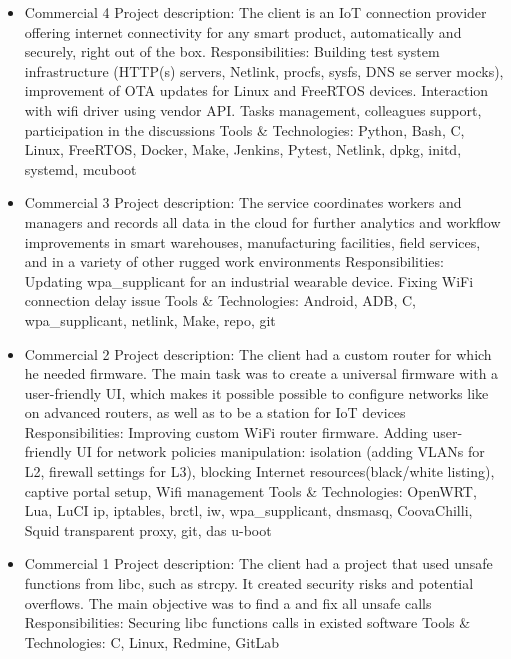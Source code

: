 \begin{itemize}
    \item Commercial 4\break
    Project description:\break
    The client is an IoT connection provider offering internet connectivity for any
    smart product, automatically and securely, right out of the box.\break
    Responsibilities:\break
    Building test system infrastructure (HTTP(s) servers, Netlink, procfs, sysfs, DNS
    se server mocks), improvement of OTA updates for Linux and FreeRTOS devices.
    Interaction with wifi driver using vendor API. Tasks management, colleagues
    support, participation in the discussions\break
    Tools \& Technologies:\break
    Python, Bash, C, Linux, FreeRTOS, Docker, Make, Jenkins, Pytest, Netlink, dpkg,
    initd, systemd, mcuboot
    \item Commercial 3\break
    Project description:\break
    The service coordinates workers and managers and records all data in the
    cloud for further analytics and workflow improvements in smart warehouses,
    manufacturing facilities, field services, and in a variety of other rugged work
    environments\break
    Responsibilities:\break
    Updating wpa\_supplicant for an industrial wearable device. Fixing WiFi
    connection delay issue
    Tools \& Technologies:\break
    Android, ADB, C, wpa\_supplicant, netlink, Make, repo, git
    \item Commercial 2\break
    Project description:\break
    The client had a custom router for which he needed firmware. The main task
    was to create a universal firmware with a user-friendly UI, which makes it
    possible possible to configure networks like on advanced routers, as well as to be a
    station for IoT devices\break
    Responsibilities:\break
    Improving custom WiFi router firmware. Adding user-friendly UI for network
    policies manipulation: isolation (adding VLANs for L2, firewall settings for L3),
    blocking Internet resources(black/white listing), captive portal setup,
    Wifi management\break
    Tools \& Technologies:\break
    OpenWRT, Lua, LuCI ip, iptables, brctl, iw, wpa\_supplicant, dnsmasq, CoovaChilli,
    Squid transparent proxy, git, das u-boot
    \item Commercial 1\break
    Project description:\break
    The client had a project that used unsafe functions from libc, such as strcpy. It
    created security risks and potential overflows. The main objective was to find
    a and fix all unsafe calls\break
    Responsibilities:\break
    Securing libc functions calls in existed software\break
    Tools \& Technologies:\break
    C, Linux, Redmine, GitLab
\end{itemize}

\newpage
